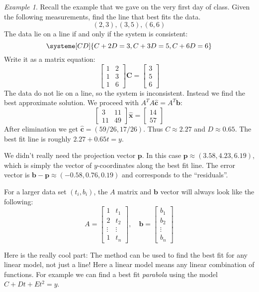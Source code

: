 \documentclass[11pt,oneside]{amsbook}
\theoremstyle{definition}
\theoremstyle{plain}
\theoremstyle{definition}
\theoremstyle{remark}
\newtheorem{example}[theorem]{Example}
\numberwithin{equation}{section}
\numberwithin{figure}{section}
\begin{document}
\begin{example}
  Recall the example that we gave on the very first day of class. Given the following measurements, find the line that best fits the data.
  \[(2,3),(3,5),(6,6)
  \]
  The data lie on a line if and only if the system is consistent:
  \[\systeme[CD]{C+2D=3,C+3D=5,C+6D=6}
  \]
  Write it as a matrix equation:
  \[\begin{bmatrix}1&2\\1&3\\1&6\end{bmatrix}
    \mathbf{C}=\begin{bmatrix}3\\5\\6\end{bmatrix}
  \]
  The data do not lie on a line, so the system is inconsistent. Instead we find the best approximate solution. We proceed with $A^TA\hat{\mathbf{c}}=A^T\mathbf{b}$:
  \[\begin{bmatrix}3&11\\11&49\end{bmatrix}\hat{\mathbf{x}}=\begin{bmatrix}14\\57\end{bmatrix}
  \]
  After elimination we get $\hat{\mathbf{c}}=(59/26,17/26)$. Thus $C\approx2.27$ and $D\approx0.65$. The best fit line is roughly $2.27+0.65t=y$.

  We didn't really need the projection vector $\mathbf{p}$. In this case $\mathbf{p}\approx(3.58,4.23,6.19)$, which is simply the vector of $y$-coordinates along the best fit line. The error vector is $\mathbf{b}-\mathbf{p}\approx(-0.58,0.76,0.19)$ and corresponds to the ``residuals''.
\end{example}

For a larger data set $(t_i,b_i)$, the $A$ matrix and $\mathbf{b}$ vector will always look like the following:
\[A=\begin{bmatrix}
    1&t_1\\
    2&t_2\\
    \vdots&\vdots\\
    1&t_n
  \end{bmatrix}
  ,\quad
  \mathbf{b}=\begin{bmatrix}b_1\\b_2\\\vdots\\b_n\end{bmatrix}
\]

Here is the really cool part: The method can be used to find the best fit for any linear model, not just a line! Here a linear model means any linear combination of functions. For example we can find a best fit \emph{parabola} using the model $C+Dt+Et^2=y$.
\end{document}
